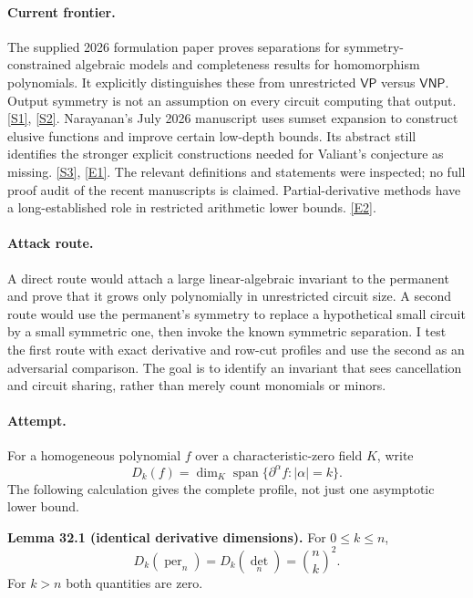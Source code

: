 \documentclass[11pt,a4paper]{article}
\newcommand{\sref}[2]{\hyperlink{source:#1:#2}{[S#2]}}
\newcommand{\eref}[2]{\hyperlink{extra:#1:#2}{[E#2]}}
\numberwithin{equation}{section}
\begin{document}
\paragraph{Current frontier.}
The supplied 2026 formulation paper proves separations for symmetry-constrained
algebraic models and completeness results for homomorphism polynomials. It
explicitly distinguishes these from unrestricted $\mathsf{VP}$ versus
$\mathsf{VNP}$. Output symmetry is not an assumption on every circuit
computing that output. \sref{statement}{1}, \sref{statement}{2}.
Narayanan's July 2026 manuscript uses sumset expansion to construct elusive
functions and improve certain low-depth bounds. Its abstract still identifies
the stronger explicit constructions needed for Valiant's conjecture as
missing. \sref{statement}{3}, \eref{statement}{1}. The relevant definitions and statements
were inspected; no full proof audit of the recent manuscripts is claimed.
Partial-derivative methods have a long-established role in restricted
arithmetic lower bounds. \eref{statement}{2}.

\paragraph{Attack route.}
A direct route would attach a large linear-algebraic invariant to the
permanent and prove that it grows only polynomially in unrestricted circuit
size. A second route would use the permanent's symmetry to replace a
hypothetical small circuit by a small symmetric one, then invoke the known
symmetric separation. I test the first route with exact derivative and
row-cut profiles and use the second as an adversarial comparison. The goal
is to identify an invariant that sees cancellation and circuit sharing,
rather than merely count monomials or minors.

\paragraph{Attempt.}
For a homogeneous polynomial $f$ over a characteristic-zero field $K$, write
\[
 D_k(f)=\dim_K\operatorname{span}\{\partial^\alpha f:|\alpha|=k\}.
\]
The following calculation gives the complete profile, not just one
asymptotic lower bound.

\textbf{Lemma 32.1 (identical derivative dimensions).}
For $0\le k\le n$,
\begin{equation}\label{r32:derivatives}
 D_k(\operatorname{per}_n)=D_k(\det_n)=\binom nk^2.
\end{equation}
For $k>n$ both quantities are zero.
\end{document}

